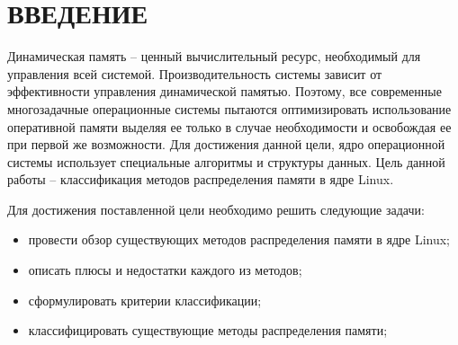 \section*{ВВЕДЕНИЕ}

Динамическая память -- ценный вычислительный ресурс, необходимый для управления всей системой. Производительность системы зависит от эффективности управления динамической памятью. Поэтому, все современные многозадачные операционные системы пытаются оптимизировать использование оперативной памяти выделяя ее только в случае необходимости и освобождая ее при первой же возможности. Для достижения данной цели, ядро операционной системы использует специальные алгоритмы и структуры данных. Цель данной работы -- классификация методов распределения памяти в ядре Linux.

Для достижения поставленной цели необходимо решить следующие задачи:

\begin{itemize}
	\item провести обзор существующих методов распределения памяти в ядре Linux;
	\item описать плюсы и недостатки каждого из методов;
	\item сформулировать критерии классификации;
	\item классифицировать существующие методы распределения памяти;
\end{itemize}

\pagebreak
